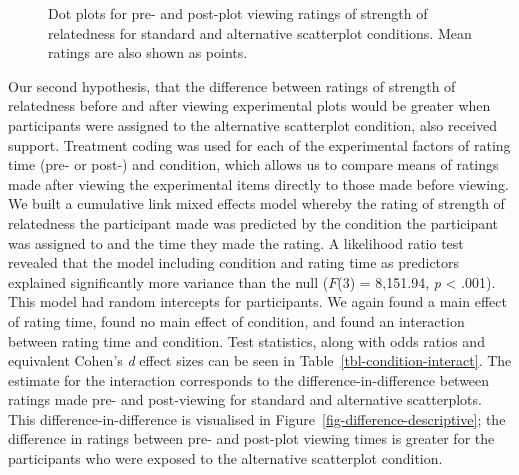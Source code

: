 \documentclass[sigconf]{acmart}
\begin{document}
\begin{figure}


\caption{\label{fig-descriptives}Dot plots for pre- and post-plot
viewing ratings of strength of relatedness for standard and alternative
scatterplot conditions. Mean ratings are also shown as points.}

\end{figure}%

Our second hypothesis, that the difference between ratings of strength
of relatedness before and after viewing experimental plots would be
greater when participants were assigned to the alternative scatterplot
condition, also received support. Treatment coding was used for each of
the experimental factors of rating time (pre- or post-) and condition,
which allows us to compare means of ratings made after viewing the
experimental items directly to those made before viewing. We built a
cumulative link mixed effects model whereby the rating of strength of
relatedness the participant made was predicted by the condition the
participant was assigned to and the time they made the rating. A
likelihood ratio test revealed that the model including condition and
rating time as predictors explained significantly more variance than the
null (\(F\)(3) = 8,151.94, \emph{p} \textless{} .001). This model had
random intercepts for participants. We again found a main effect of
rating time, found no main effect of condition, and found an interaction
between rating time and condition. Test statistics, along with odds
ratios and equivalent Cohen's \emph{d} effect sizes can be seen in
Table~\ref{tbl-condition-interact}. The estimate for the interaction
corresponds to the difference-in-difference between ratings made pre-
and post-viewing for standard and alternative scatterplots. This
difference-in-difference is visualised in
Figure~\ref{fig-difference-descriptive}; the difference in ratings
between pre- and post-plot viewing times is greater for the participants
who were exposed to the alternative scatterplot condition.
\end{document}
